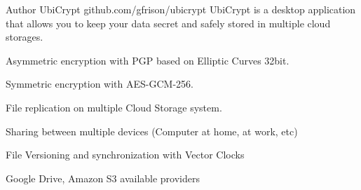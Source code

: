 
\begin{cventries}
  \cventry
    {Author} %
    {UbiCrypt} %
    {github.com/gfrison/ubicrypt} %
    {} %
    {UbiCrypt is a desktop application that allows you to keep your data secret and safely stored in multiple cloud storages.}
    {
      \begin{cvitems}
        \item {Asymmetric encryption with PGP based on Elliptic Curves 32bit.}
        \item {Symmetric encryption with AES-GCM-256.}
        \item {File replication on multiple Cloud Storage system.}
        \item {Sharing between multiple devices (Computer at home, at work, etc)}
        \item {File Versioning and synchronization with Vector Clocks}
        \item {Google Drive, Amazon S3 available providers}
      \end{cvitems}
    }

\end{cventries}
